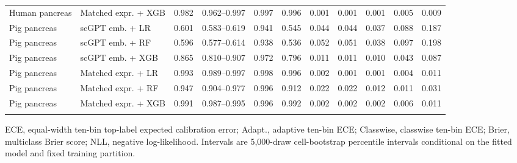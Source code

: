 \begin{landscape}
\begin{longtable}{llccccccccc}
Human pancreas & Matched expr. + XGB & 0.982 & 0.962--0.997 & 0.997 & 0.996 & 0.001 & 0.001 & 0.001 & 0.005 & 0.009 \\
\addlinespace
Pig pancreas & scGPT emb. + LR & 0.601 & 0.583--0.619 & 0.941 & 0.545 & 0.044 & 0.044 & 0.037 & 0.088 & 0.187 \\
Pig pancreas & scGPT emb. + RF & 0.596 & 0.577--0.614 & 0.938 & 0.536 & 0.052 & 0.051 & 0.038 & 0.097 & 0.198 \\
Pig pancreas & scGPT emb. + XGB & 0.865 & 0.810--0.907 & 0.972 & 0.796 & 0.011 & 0.011 & 0.010 & 0.043 & 0.087 \\
Pig pancreas & Matched expr. + LR & 0.993 & 0.989--0.997 & 0.998 & 0.996 & 0.002 & 0.001 & 0.001 & 0.004 & 0.011 \\
Pig pancreas & Matched expr. + RF & 0.947 & 0.904--0.977 & 0.996 & 0.912 & 0.022 & 0.022 & 0.012 & 0.011 & 0.031 \\
Pig pancreas & Matched expr. + XGB & 0.991 & 0.987--0.995 & 0.996 & 0.992 & 0.002 & 0.002 & 0.002 & 0.006 & 0.011 \\
\addlinespace
\end{longtable}
\begin{minipage}{0.98\linewidth}\footnotesize ECE, equal-width ten-bin top-label expected calibration error; Adapt., adaptive ten-bin ECE; Classwise, classwise ten-bin ECE; Brier, multiclass Brier score; NLL, negative log-likelihood. Intervals are 5,000-draw cell-bootstrap percentile intervals conditional on the fitted model and fixed training partition.\end{minipage}
\end{landscape}
